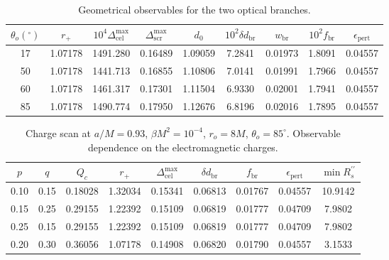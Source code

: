 \begin{table}[t]
\centering
\caption{Geometrical observables for the two optical branches.}
\begin{tabular}{ccccccccc}
\hline
$\theta_o({}^{\circ})$ & $r_+$ & $10^4\Delta_{\mathrm{cel}}^{\max}$ & $\Delta_{\mathrm{scr}}^{\max}$ & $d_0$ & $10^2\delta d_{\mathrm{br}}$ & $w_{\mathrm{br}}$ & $10^2 f_{\mathrm{br}}$ & $\epsilon_{\mathrm{pert}}$ \\
\hline
17 & 1.07178 & 1491.280 & 0.16489 & 1.09059 & 7.2841 & 0.01973 & 1.8091 & 0.04557 \\
50 & 1.07178 & 1441.713 & 0.16855 & 1.10806 & 7.0141 & 0.01991 & 1.7966 & 0.04557 \\
60 & 1.07178 & 1461.317 & 0.17301 & 1.11504 & 6.9330 & 0.02001 & 1.7941 & 0.04557 \\
85 & 1.07178 & 1490.774 & 0.17950 & 1.12676 & 6.8196 & 0.02016 & 1.7895 & 0.04557 \\
\hline
\end{tabular}
\end{table}

\begin{table}[t]
\centering
\caption{Charge scan at $a/M=0.93$, $\beta M^2=10^{-4}$, $r_o=8M$, $\theta_o=85^\circ$. Observable dependence on the electromagnetic charges.}
\begin{tabular}{ccccccccc}
\hline
$p$ & $q$ & $Q_c$ & $r_+$ & $\Delta_{\mathrm{cel}}^{\max}$ & $\delta d_{\mathrm{br}}$ & $f_{\mathrm{br}}$ & $\epsilon_{\mathrm{pert}}$ & $\min R_s^{\prime\prime}$ \\
\hline
0.10 & 0.15 & 0.18028 & 1.32034 & 0.15341 & 0.06813 & 0.01767 & 0.04557 & 10.9142 \\
0.15 & 0.25 & 0.29155 & 1.22392 & 0.15109 & 0.06819 & 0.01777 & 0.04709 & 7.9802 \\
0.25 & 0.15 & 0.29155 & 1.22392 & 0.15109 & 0.06819 & 0.01777 & 0.04709 & 7.9802 \\
0.20 & 0.30 & 0.36056 & 1.07178 & 0.14908 & 0.06820 & 0.01790 & 0.04557 & 3.1533 \\
\hline
\end{tabular}
\end{table}
